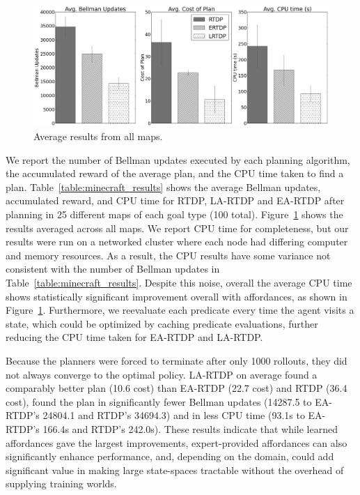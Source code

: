 \documentclass[letterpaper]{article}
\begin{document}
\begin{figure}[t]
\centering
\includegraphics[width=1\linewidth]{figures/average_results_cropped.png}%
\caption{Average results from all maps.}
\label{fig:average_results}
\end{figure}

We report the number of Bellman updates executed by each planning
algorithm, the accumulated reward of the average plan, and the CPU
time taken to find a plan. Table~\ref{table:minecraft_results} shows
the average Bellman updates, accumulated reward, and CPU time for
RTDP, LA-RTDP and EA-RTDP after planning in 25 different maps of each
goal type (100 total). Figure~\ref{fig:average_results} shows the
results averaged across all maps.  We report CPU time for
completeness, but our results were run on a networked cluster where
each node had differing computer and memory resources. As a result,
the CPU results have some variance not consistent with the number of
Bellman updates in Table~\ref{table:minecraft_results}.  Despite this
noise, overall the average CPU time shows statistically significant
improvement overall with affordances, as shown in
Figure~\ref{fig:average_results}. Furthermore, we reevaluate each
predicate every time the agent visits a state, which could be optimized by caching predicate evaluations, further
reducing the CPU time taken for EA-RTDP and LA-RTDP.

Because the planners were forced to terminate after only 1000
rollouts, they did not always converge to the optimal policy. LA-RTDP on
average found a comparably better plan (10.6 cost) than EA-RTDP (22.7
cost) and RTDP (36.4 cost), found the plan in significantly fewer
Bellman updates (14287.5 to EA-RTDP's 24804.1 and RTDP's 34694.3) and in
less CPU time (93.1s to EA-RTDP's 166.4s and RTDP's 242.0s).  These
results indicate that while learned affordances gave the largest
improvements, expert-provided affordances can also significantly
enhance performance, and, depending on the domain, could add
significant value in making large state-spaces tractable without the
overhead of supplying training worlds.
\end{document}
